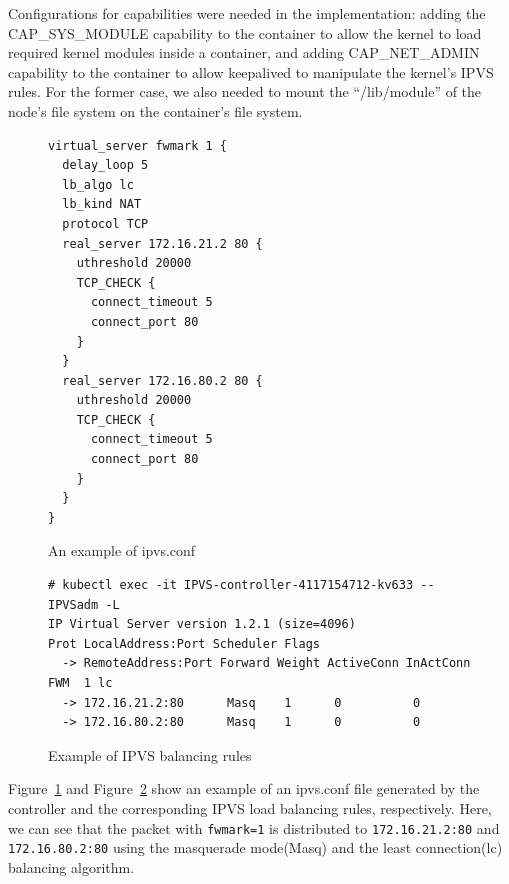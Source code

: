 
Configurations for capabilities were needed in the implementation: adding the CAP\_SYS\_MODULE capability 
to the container to allow the kernel to load required kernel modules inside a container, 
and adding CAP\_NET\_ADMIN capability to the container to allow keepalived to manipulate the kernel's IPVS rules. 
For the former case, we also needed to mount the \enquote{/lib/module} of the node's file system on the container's file system.

\begin{figure}
\begin{minipage}{0.7\columnwidth}
\begin{verbatim}
virtual_server fwmark 1 {
  delay_loop 5
  lb_algo lc
  lb_kind NAT
  protocol TCP
  real_server 172.16.21.2 80 {
    uthreshold 20000
    TCP_CHECK {
      connect_timeout 5
      connect_port 80
    }
  }
  real_server 172.16.80.2 80 {
    uthreshold 20000
    TCP_CHECK {
      connect_timeout 5
      connect_port 80
    }
  }
}
\end{verbatim}
\end{minipage}
\caption{An example of ipvs.conf}
\label{fig:ipvs.conf}
\end{figure}

\begin{figure}
\begin{minipage}{\columnwidth}
\small
\begin{verbatim}
# kubectl exec -it IPVS-controller-4117154712-kv633 -- IPVSadm -L
IP Virtual Server version 1.2.1 (size=4096)
Prot LocalAddress:Port Scheduler Flags
  -> RemoteAddress:Port Forward Weight ActiveConn InActConn
FWM  1 lc
  -> 172.16.21.2:80      Masq    1      0          0         
  -> 172.16.80.2:80      Masq    1      0          0
\end{verbatim}
\end{minipage}
\caption{Example of IPVS balancing rules}
\label{fig:IPVS rule}
\end{figure}


Figure~\ref{fig:ipvs.conf} and Figure~\ref{fig:IPVS rule} show an example of an ipvs.conf file 
generated by the controller and the corresponding IPVS load balancing rules, respectively.
Here, we can see that the packet with {\tt fwmark=1}\cite{BertHubert2002} is distributed 
to {\tt 172.16.21.2:80} and {\tt 172.16.80.2:80} 
using the masquerade mode(Masq) and 
the least connection(lc)\cite{Zhang2000} balancing algorithm.

